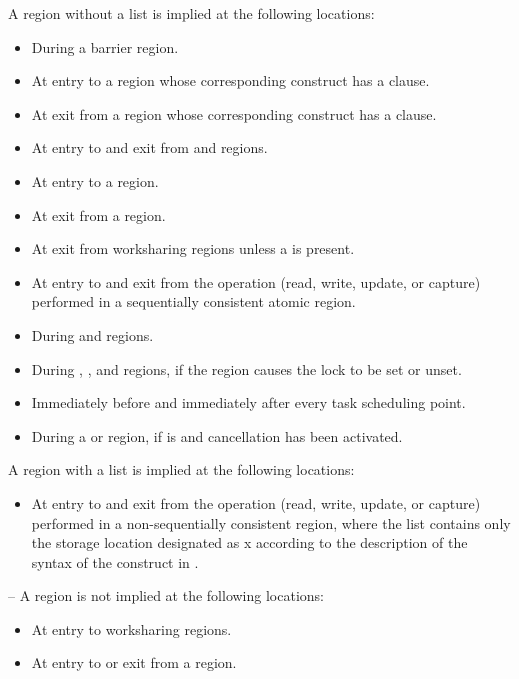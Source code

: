 A  region without a list is implied at the following locations:
\begin{itemize}
\item During a barrier region.
\item At entry to a  region whose corresponding construct has a  clause.
\item At exit from a  region whose corresponding construct has a  clause.
\item At entry to and exit from  and  regions.
\item At entry to a  region. 
\item At exit from a  region. 
\item At exit from worksharing regions unless a  is present.
\item At entry to and exit from the  operation (read, write, update, or capture) 
performed in a sequentially consistent atomic region.
\item During  and  regions.
\item During , ,  
and  regions, if the region causes the lock to be set or unset.
\item Immediately before and immediately after every task scheduling point.
\item During a  or  region, if  is  and cancellation has been activated.
\end{itemize}

A  region with a list is implied at the following locations:
\begin{itemize}
\item At entry to and exit from the  operation (read, write, update, or capture) 
performed in a non-sequentially consistent  region, where the list contains 
only the storage location designated as x according to the description of the syntax of 
the  construct in 
.
\end{itemize}

\notestart
\noteheader – A  region is not implied at the following locations:

\begin{itemize}
\item At entry to worksharing regions.

\item At entry to or exit from a  region.
\end{itemize}
\noteend










